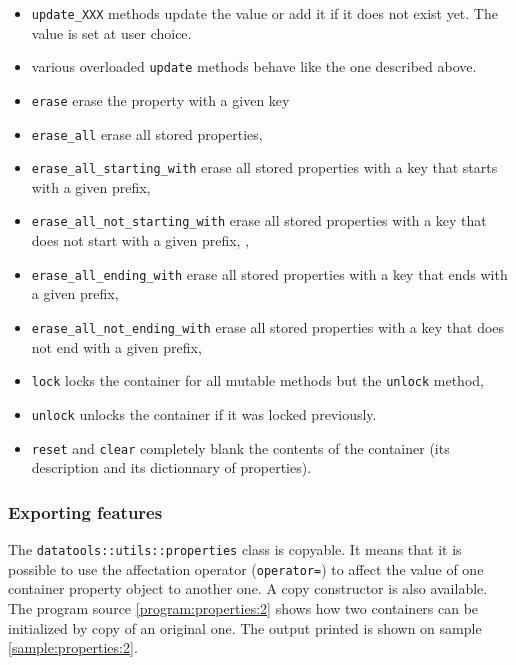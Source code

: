 \begin{itemize}
\item \texttt{update\_XXX}  methods update the  value or add it  if it
  does not exist yet. The value is set at user choice.

\item various overloaded \texttt{update} methods behave like
the one described above.

\item \texttt{erase}  erase the property with a given key

\item \texttt{erase\_all}  erase all stored properties,

\item \texttt{erase\_all\_starting\_with}  erase all stored properties
with a key that starts with a given prefix,

\item \texttt{erase\_all\_not\_starting\_with}  erase all stored properties
with a key that does not start with a given prefix,
,

\item \texttt{erase\_all\_ending\_with}  erase all stored properties
with a key that ends with a given prefix,

\item \texttt{erase\_all\_not\_ending\_with}  erase all stored properties
with a key that does not end with a given prefix,

\item \texttt{lock}  locks the container  for all mutable  methods but
  the \texttt{unlock} method,

\item  \texttt{unlock} unlocks the container if it was locked
  previously.

\item  \texttt{reset} and \texttt{clear} completely blank the contents
of the container (its description and its dictionnary of properties).

\end{itemize}


\subsubsection{Exporting features}

The \texttt{datatools::utils::properties} class  is copyable. It means
that it is possible to use the affectation operator (\verb+operator=+)
to affect the value of one container property object to another one. A
copy   constructor   is    also   available.    The   program   source
\ref{program:properties:2} shows how two containers can be initialized
by copy  of an  original one.  The output printed  is shown  on sample
\ref{sample:properties:2}.



